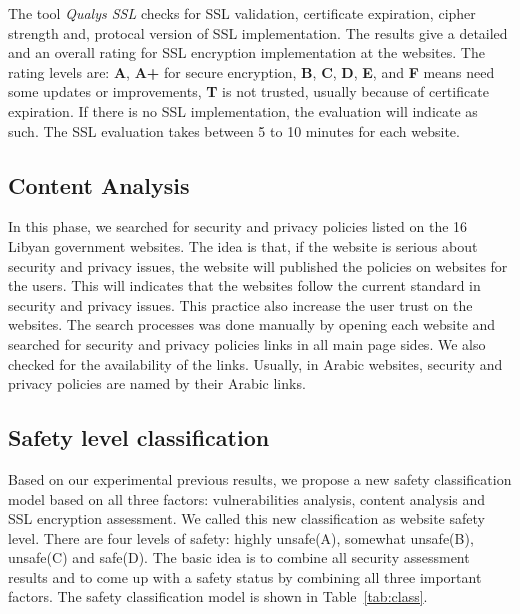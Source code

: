 \documentclass[conference]{IEEEtran}
\begin{document}
The tool \emph{Qualys SSL} checks
for SSL validation, certificate expiration, cipher strength and, protocal version of SSL implementation. The results give a detailed and an overall
rating for SSL encryption implementation at the websites. The rating levels are: \textbf{A},
\textbf{A+} for secure encryption, \textbf{B},
\textbf{C}, \textbf{D}, \textbf{E}, and \textbf{F} means
need some updates or improvements, \textbf{T} is not
trusted, usually because of certificate expiration. If there is no SSL implementation, the evaluation will indicate as such.
The SSL evaluation takes between 5 to 10 minutes for each website.

\subsection{Content Analysis}

In this phase, we searched for security and privacy
policies listed on the 16 Libyan government
websites. The idea is that, if the website is serious about security and privacy issues, the website will published the policies on websites for the users. This will indicates that the websites follow the current standard in security and privacy issues. This practice also increase the user trust on the websites. The search processes was done manually by opening each website and searched
for security and privacy policies links in all main
page sides. We also checked for the availability of the links. Usually, in Arabic websites, security and privacy policies are named by their Arabic links.

\subsection{Safety level classification}

Based on our experimental previous results, we propose a new safety classification model based on all three factors: vulnerabilities analysis, content analysis and SSL encryption assessment. We called this new classification as website safety level. There are four levels of safety: highly unsafe(A), somewhat unsafe(B), unsafe(C) and safe(D).
The basic idea is to combine all security assessment results and to come up with a safety status by combining all three important factors. The safety classification model is shown in Table~\ref{tab:class}.
\end{document}
